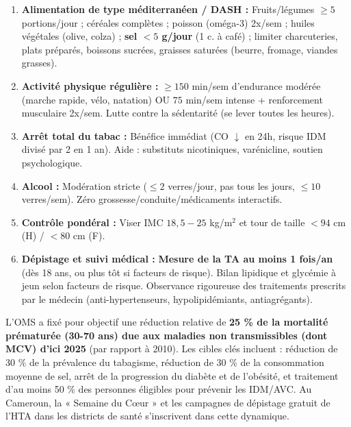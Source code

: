 \documentclass[11pt]{article}
\begin{document}
\begin{aretenir}
\begin{enumerate}
    \item \textbf{Alimentation de type méditerranéen / DASH :} Fruits/légumes $\ge 5$ portions/jour ; céréales complètes ; poisson (oméga-3) 2x/sem ; huiles végétales (olive, colza) ; \textbf{sel $< 5$ g/jour} (1 c. à café) ; limiter charcuteries, plats préparés, boissons sucrées, graisses saturées (beurre, fromage, viandes grasses).
    \item \textbf{Activité physique régulière :} $\ge 150$ min/sem d'endurance modérée (marche rapide, vélo, natation) OU $75$ min/sem intense + renforcement musculaire 2x/sem. Lutte contre la sédentarité (se lever toutes les heures).
    \item \textbf{Arrêt total du tabac :} Bénéfice immédiat (CO $\downarrow$ en 24h, risque IDM divisé par 2 en 1 an). Aide : substituts nicotiniques, varénicline, soutien psychologique.
    \item \textbf{Alcool :} Modération stricte ($\le 2$ verres/jour, pas tous les jours, $\le 10$ verres/sem). Zéro grossesse/conduite/médicaments interactifs.
    \item \textbf{Contrôle pondéral :} Viser IMC $18,5 - 25$ kg/m$^2$ et tour de taille $< 94$ cm (H) / $< 80$ cm (F).
    \item \textbf{Dépistage et suivi médical :} \textbf{Mesure de la TA au moins 1 fois/an} (dès 18 ans, ou plus tôt si facteurs de risque). Bilan lipidique et glycémie à jeun selon facteurs de risque. Observance rigoureuse des traitements prescrits par le médecin (anti-hypertenseurs, hypolipidémiants, antiagrégants).
\end{enumerate}
\end{aretenir}

\begin{savaistu}
L'OMS a fixé pour objectif une réduction relative de \textbf{25 \% de la mortalité prématurée (30-70 ans) due aux maladies non transmissibles (dont MCV) d'ici 2025} (par rapport à 2010). Les cibles clés incluent : réduction de 30 \% de la prévalence du tabagisme, réduction de 30 \% de la consommation moyenne de sel, arrêt de la progression du diabète et de l'obésité, et traitement d'au moins 50 \% des personnes éligibles pour prévenir les IDM/AVC. Au Cameroun, la « Semaine du Cœur » et les campagnes de dépistage gratuit de l'HTA dans les districts de santé s'inscrivent dans cette dynamique.
\end{savaistu}
\end{document}
